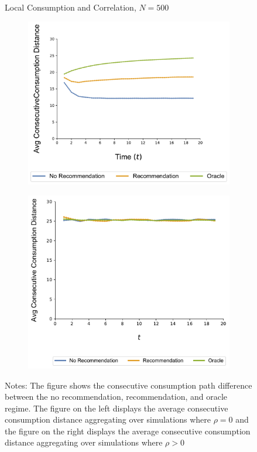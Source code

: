 \documentclass[format=acmsmall, review=true]{acmart}
\begin{document}
\begin{figure}[H]
\caption{Local Consumption and Correlation, $N = 500$}
\begin{subfigure}{.5\linewidth}
  \centering
  \includegraphics[width=.9\linewidth]{figures/rho_pos_consumption_dist_N_100T_20_overall.pdf}
  \label{fig:sfig1}
\end{subfigure}%
\begin{subfigure}{.5\linewidth}
  \centering
  \includegraphics[width=.9\linewidth]{figures/rho_zero_consumption_dist_N_100T_20_overall.pdf}
  \label{fig:sfig2}
\end{subfigure}
\caption*{\scriptsize Notes: The figure shows the consecutive consumption path difference between the no recommendation, recommendation, and oracle regime. The figure on the left displays the average consecutive consumption distance aggregating over simulations where $\rho = 0$ and the figure on the right displays the average consecutive consumption distance aggregating over simulations where $\rho > 0$}
\label{fig:correlation_consumption_path_n_100}
\end{figure}

\end{document}
